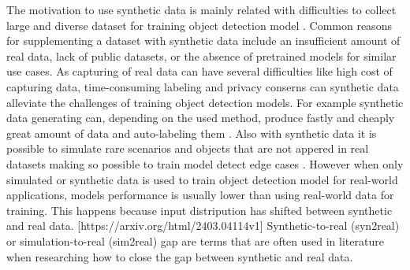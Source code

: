     The motivation to use synthetic data is mainly related with difficulties to collect large and diverse dataset for training object detection model \cite{voetman2023bigdatamythusing}. Common reasons for supplementing a dataset with synthetic data include an insufficient amount of real data, lack of public datasets, or the absence of pretrained models for similar use cases. As capturing of real data can have several difficulties like high cost of capturing data, time-consuming labeling and privacy conserns can synthetic data alleviate the challenges of training object detection models. \cite{kiefer2021leveragingsyntheticdataobject, Delussu2024synthetic, nguyen2024application} For example synthetic data generating can, depending on the used method, produce fastly and cheaply great amount of data and auto-labeling them \cite{kiefer2021leveragingsyntheticdataobject, nguyen2024application}. Also with synthetic data it is possible to simulate rare scenarios and objects that are not appered in real datasets making so possible to train model detect edge cases \cite{Zhang2024, edgecases}. However when only simulated or synthetic data is used to train object detection model for real-world applications, models performance is usually lower than using real-world data for training. This happens because input distripution has shifted between synthetic and real data. [https://arxiv.org/html/2403.04114v1] 
Synthetic-to-real (syn2real) or simulation-to-real (sim2real) gap are terms that are often used in literature when researching how to close the gap between synthetic and real data.




